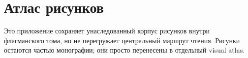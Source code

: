 \section{Атлас рисунков}
\label{sec:oc-core-1-3-figure-atlas}

Это приложение сохраняет унаследованный корпус рисунков внутри флагманского
тома, но не перегружает центральный маршрут чтения. Рисунки остаются частью
монографии; они просто перенесены в отдельный visual atlas.

\begingroup
\let\ocappendixsection\section
\let\ocappendixsubsection\subsection
\let\ocappendixsubsubsection\subsubsection
\renewcommand{\section}{\ocappendixsubsection}
\renewcommand{\subsection}{\ocappendixsubsubsection}

\endgroup
